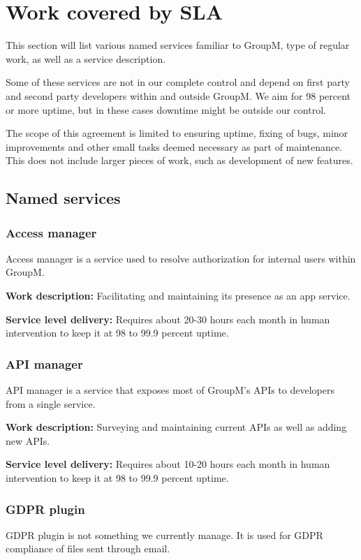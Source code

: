 \section{Work covered by SLA}
This section will list various named services familiar to GroupM, type of regular work, as well as a service description.

Some of these services are not in our complete control and depend on first party and second party developers within and outside GroupM. We aim for 98 percent or more uptime, but in these cases downtime might be outside our control.

The scope of this agreement is limited to ensuring uptime, fixing of bugs, minor improvements and other small tasks deemed necessary as part of maintenance. This does not include larger pieces of work, such as development of new features.

%

\subsection{Named services}


\subsubsection{Access manager}
Access manager is a service used to resolve authorization for internal users within GroupM. 

\textbf{Work description:} Facilitating and maintaining its presence as an app service.

\textbf{Service level delivery:} Requires about 20-30 hours each month in human intervention to keep it at 98 to 99.9 percent uptime.

\subsubsection{API manager}
API manager is a service that exposes most of GroupM's APIs to developers from a single service.

\textbf{Work description:} Surveying and maintaining current APIs as well as adding new APIs.

\textbf{Service level delivery:} Requires about 10-20 hours each month in human intervention to keep it at 98 to 99.9 percent uptime.

\subsubsection{GDPR plugin}
GDPR plugin is not something we currently manage. It is used for GDPR compliance of files sent through email.

